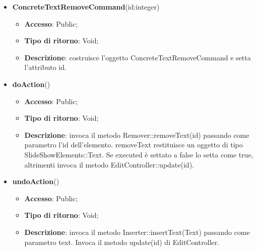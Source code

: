 {{{	
	\begin{itemize}
		\item \textbf{ConcreteTextRemoveCommand}(id:integer)
		\begin{itemize}
			\item \textbf{Accesso}: Public;
			\item \textbf{Tipo di ritorno}: Void;
			\item \textbf{Descrizione}: costruisce l’oggetto ConcreteTextRemoveCommand e setta l’attributo id.
		\end{itemize}
		\item \textbf{doAction}()
		\begin{itemize}
			\item \textbf{Accesso}: Public;
			\item \textbf{Tipo di ritorno}: Void;
			\item \textbf{Descrizione}: invoca il metodo Remover::removeText(id) passando come parametro l’id dell’elemento. removeText restituisce un oggetto di tipo SlideShowElements::Text. Se executed è settato a false lo setta come true, altrimenti invoca il metodo EditController::update(id).
		\end{itemize}
		\item \textbf{undoAction}()
		\begin{itemize}
			\item \textbf{Accesso}: Public;
			\item \textbf{Tipo di ritorno}: Void;
			\item \textbf{Descrizione}: invoca il metodo Inserter::insertText(Text) passando come parametro text. Invoca il metodo update(id) di EditController.
		\end{itemize}
	\end{itemize}
	}
}}
